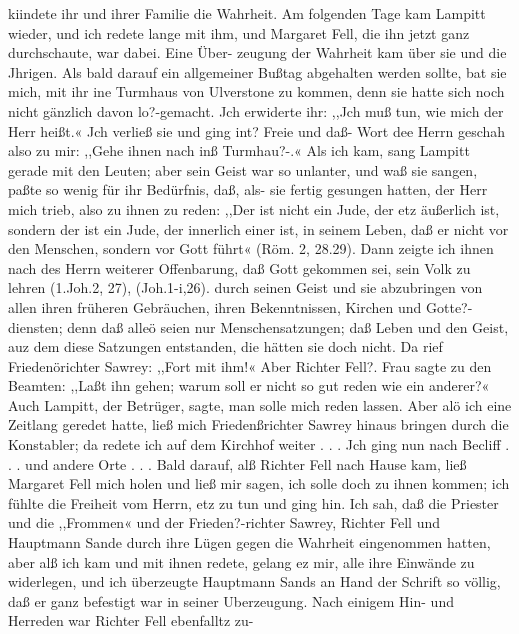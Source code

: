 kiindete ihr und ihrer Familie die Wahrheit. Am folgenden Tage
kam Lampitt wieder, und ich redete lange mit ihm, und Margaret
Fell, die ihn jetzt ganz durchschaute, war dabei. Eine Über-
zeugung der Wahrheit kam über sie und die Jhrigen. Als bald
darauf ein allgemeiner Bußtag abgehalten werden sollte, bat sie
mich, mit ihr ine Turmhaus von Ulverstone zu kommen, denn
sie hatte sich noch nicht gänzlich davon lo?-gemacht. Jch erwiderte
ihr: ,,Jch muß tun, wie mich der Herr heißt.« Jch verließ sie
und ging int? Freie und daß- Wort dee Herrn geschah also zu
mir: ,,Gehe ihnen nach inß Turmhau?-.« Als ich kam, sang
Lampitt gerade mit den Leuten; aber sein Geist war so unlanter,
und waß sie sangen, paßte so wenig für ihr Bedürfnis, daß, als-
sie fertig gesungen hatten, der Herr mich trieb, also zu ihnen zu
reden: ,,Der ist nicht ein Jude, der etz äußerlich ist, sondern der
ist ein Jude, der innerlich einer ist, in seinem Leben, daß er nicht
vor den Menschen, sondern vor Gott führt« (Röm. 2, 28.29).
Dann zeigte ich ihnen nach des Herrn weiterer Offenbarung, daß
Gott gekommen sei, sein Volk zu lehren (1.Joh.2, 27), (Joh.1-i,26).
durch seinen Geist und sie abzubringen von allen ihren früheren
Gebräuchen, ihren Bekenntnissen, Kirchen und Gotte?-diensten;
denn daß alleö seien nur Menschensatzungen; daß Leben und den
Geist, auz dem diese Satzungen entstanden, die hätten sie doch
nicht. Da rief Friedenörichter Sawrey: ,,Fort mit ihm!« Aber
Richter Fell?. Frau sagte zu den Beamten: ,,Laßt ihn gehen;
warum soll er nicht so gut reden wie ein anderer?« Auch Lampitt,
der Betrüger, sagte, man solle mich reden lassen. Aber alö ich eine
Zeitlang geredet hatte, ließ mich Friedenßrichter Sawrey hinaus
bringen durch die Konstabler; da redete ich auf dem Kirchhof
weiter . . . Jch ging nun nach Becliff . . . und andere Orte . . .
Bald darauf, alß Richter Fell nach Hause kam, ließ Margaret
Fell mich holen und ließ mir sagen, ich solle doch zu ihnen
kommen; ich fühlte die Freiheit vom Herrn, etz zu tun und ging
hin. Ich sah, daß die Priester und die ,,Frommen« und der
Frieden?-richter Sawrey, Richter Fell und Hauptmann Sande durch
ihre Lügen gegen die Wahrheit eingenommen hatten, aber alß ich
kam und mit ihnen redete, gelang ez mir, alle ihre Einwände zu
widerlegen, und ich überzeugte Hauptmann Sands an Hand der
Schrift so völlig, daß er ganz befestigt war in seiner Uberzeugung.
Nach einigem Hin- und Herreden war Richter Fell ebenfalltz zu-


